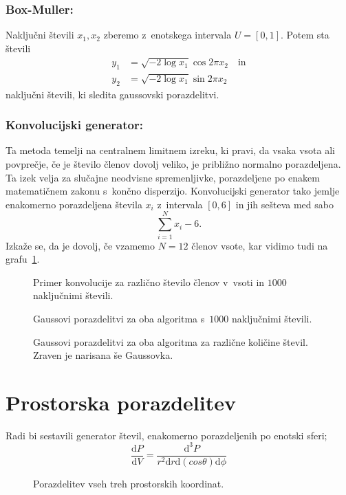 \documentclass[a4paper,pdftex,12pt]{article}
\numberwithin{figure}{section} %
\begin{document}
\subsubsection*{Box-Muller:}
Naključni števili $x_1,x_2$ zberemo z~enotskega intervala $U=[0,1]$. Potem sta števili
\begin{align}
    y_1 &= \sqrt{-2 \log x_1} \cos 2\pi x_2 \quad \mathrm{in} \\
    y_2 &= \sqrt{-2 \log x_1} \sin 2\pi x_2
\end{align}
naključni števili, ki sledita gaussovski porazdelitvi.

\subsubsection*{Konvolucijski generator:}
Ta metoda temelji na centralnem limitnem izreku, ki pravi, da vsaka vsota ali povprečje,
če je število členov dovolj veliko, je približno normalno porazdeljena. Ta izek velja
za slučajne neodvisne spremenljivke, porazdeljene po enakem matematičnem zakonu s~končno
disperzijo. Konvolucijski generator tako jemlje enakomerno porazdeljena števila $x_i$ 
z~intervala $[0,6]$ in jih sešteva med sabo
\begin{equation}\label{konvolucija}
    \sum_{i=1}^{N} x_i -6.
\end{equation} 
Izkaže se, da je dovolj, če vzamemo $N=12$ členov vsote, kar vidimo tudi na 
grafu~\ref{slika1}.
\begin{figure}    
    \resizebox{0.98\linewidth}{!}{}
    \caption{Primer konvolucije za različno število členov v~vsoti in $1000$ naključnimi 
    števili.}
    \label{slika1}
\end{figure}
\begin{figure}    
    \resizebox{0.98\linewidth}{!}{}
    \caption{Gaussovi porazdelitvi za oba algoritma s~$1000$ naključnimi števili.}
    \label{slika2}
\end{figure}
\begin{figure}    
    \resizebox{1\linewidth}{!}{}
    \caption{Gaussovi porazdelitvi za oba algoritma za različne količine števil. Zraven
    je narisana še Gaussovka.}
    \label{slika3}
\end{figure}


\section{Prostorska porazdelitev}
Radi bi sestavili generator števil, enakomerno porazdeljenih po enotski sferi;
\begin{equation}
    \frac{\mathrm{d}P}{\mathrm{d} V} =  \frac{\mathrm{d}^3P}{r^2\mathrm{d}r 
    \mathrm{d}(cos\theta) \mathrm{d}\phi}
\end{equation}

\begin{figure}    
    \resizebox{1\linewidth}{!}{}
    \caption{Porazdelitev vseh treh prostorskih koordinat.}
    \label{slika4}
\end{figure}
\end{document}
